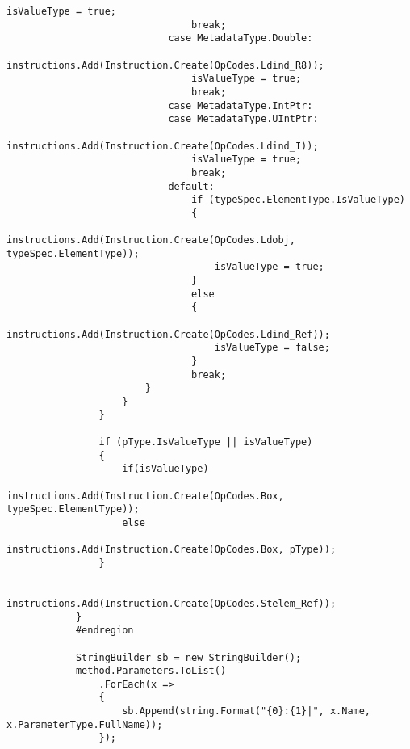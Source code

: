 \begin{lstlisting}[caption={../buffalo/Extensions/Extensions.cs}, label=../buffalo/Extensions/Extensions.cs, frame=tb, basicstyle=\scriptsize]
                                isValueType = true;
                                break;
                            case MetadataType.Double:
                                instructions.Add(Instruction.Create(OpCodes.Ldind_R8));
                                isValueType = true;
                                break;
                            case MetadataType.IntPtr:
                            case MetadataType.UIntPtr:
                                instructions.Add(Instruction.Create(OpCodes.Ldind_I));
                                isValueType = true;
                                break;
                            default:
                                if (typeSpec.ElementType.IsValueType)
                                {
                                    instructions.Add(Instruction.Create(OpCodes.Ldobj, typeSpec.ElementType));
                                    isValueType = true;
                                }
                                else
                                {
                                    instructions.Add(Instruction.Create(OpCodes.Ldind_Ref));
                                    isValueType = false;
                                }
                                break;
                        }
                    }
                }

                if (pType.IsValueType || isValueType)
                {
                    if(isValueType)
                        instructions.Add(Instruction.Create(OpCodes.Box, typeSpec.ElementType));
                    else
                        instructions.Add(Instruction.Create(OpCodes.Box, pType));
                }

                instructions.Add(Instruction.Create(OpCodes.Stelem_Ref));
            }
            #endregion

            StringBuilder sb = new StringBuilder();
            method.Parameters.ToList()
                .ForEach(x =>
                {
                    sb.Append(string.Format("{0}:{1}|", x.Name, x.ParameterType.FullName));
                });


\end{lstlisting}
